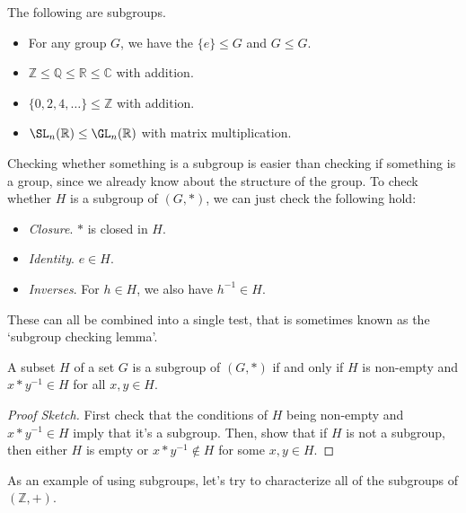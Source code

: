\documentclass[a4paper]{scrartcl}
\begin{document}
\begin{example}
	The following are subgroups.
	\begin{itemize}
		\item For any group $G$, we have the  $\{ e \} \leq G$ and $G \leq G$.
		\item $\mathbb{Z} \leq \mathbb{Q} \leq \mathbb{R} \leq \mathbb{C}$ with addition.
		\item $\{ 0, 2, 4, \dots \} \leq \mathbb{Z}$ with addition.
		\item $\SL_n(\mathbb{R}) \leq \GL_n(\mathbb{R})$ with matrix multiplication.
	\end{itemize}
\end{example}


Checking whether something is a subgroup is easier than checking if something is a group, since we already know about the structure of the group. To check whether $H$ is a subgroup of $(G, *)$, we can just check the following hold:
\begin{itemize}
	\item \emph{Closure}. $*$ is closed in $H$.
	\item \emph{Identity}. $e \in H$.
	\item \emph{Inverses}. For $h \in H$, we also have $h^{-1} \in H$. 
\end{itemize}

These can all be combined into a single test, that is sometimes known as the `subgroup checking lemma'.

\begin{lemma}
	A subset $H$ of a set $G$ is a subgroup of $(G, *)$ if and only if $H$ is non-empty and $x * y^{-1} \in H$ for all $x, y \in H$.
\end{lemma}
\begin{proof}[Proof Sketch]
	First check that the conditions of $H$ being non-empty and $x * y^{-1} \in H$ imply that it's a subgroup. Then, show that if $H$ is not a subgroup, then either $H$ is empty or $x * y^{-1} \not\in H$ for some $x, y \in H$.
\end{proof}

As an example of using subgroups, let's try to characterize all of the subgroups of $(\mathbb{Z}, +)$.
\end{document}
